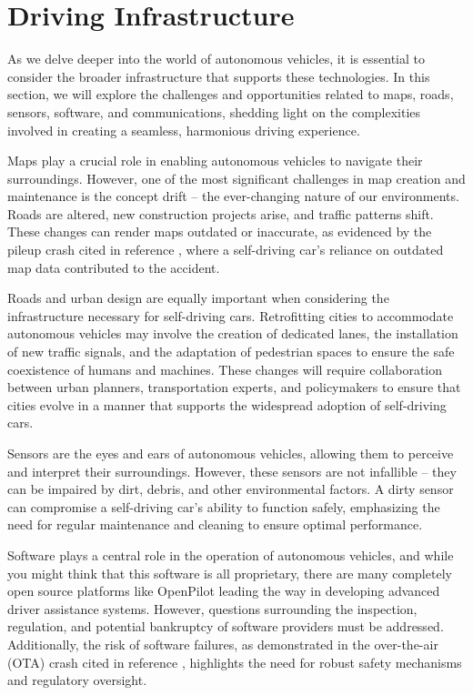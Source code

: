 \section{Driving Infrastructure}

As we delve deeper into the world of autonomous vehicles, it is essential to consider the broader infrastructure that supports these technologies. In this section, we will explore the challenges and opportunities related to maps, roads, sensors, software, and communications, shedding light on the complexities involved in creating a seamless, harmonious driving experience.

Maps play a crucial role in enabling autonomous vehicles to navigate their surroundings. However, one of the most significant challenges in map creation and maintenance is the concept drift – the ever-changing nature of our environments. Roads are altered, new construction projects arise, and traffic patterns shift. These changes can render maps outdated or inaccurate, as evidenced by the pileup crash cited in reference , where a self-driving car's reliance on outdated map data contributed to the accident.

Roads and urban design are equally important when considering the infrastructure necessary for self-driving cars. Retrofitting cities to accommodate autonomous vehicles may involve the creation of dedicated lanes, the installation of new traffic signals, and the adaptation of pedestrian spaces to ensure the safe coexistence of humans and machines. These changes will require collaboration between urban planners, transportation experts, and policymakers to ensure that cities evolve in a manner that supports the widespread adoption of self-driving cars.

Sensors are the eyes and ears of autonomous vehicles, allowing them to perceive and interpret their surroundings. However, these sensors are not infallible – they can be impaired by dirt, debris, and other environmental factors. A dirty sensor can compromise a self-driving car's ability to function safely, emphasizing the need for regular maintenance and cleaning to ensure optimal performance.

Software plays a central role in the operation of autonomous vehicles, and while you might think that this software is all proprietary, there are many completely open source platforms like OpenPilot \cite{openpilot} leading the way in developing advanced driver assistance systems. However, questions surrounding the inspection, regulation, and potential bankruptcy of software providers must be addressed. Additionally, the risk of software failures, as demonstrated in the over-the-air (OTA) crash cited in reference \cite{otacrash}, highlights the need for robust safety mechanisms and regulatory oversight.

